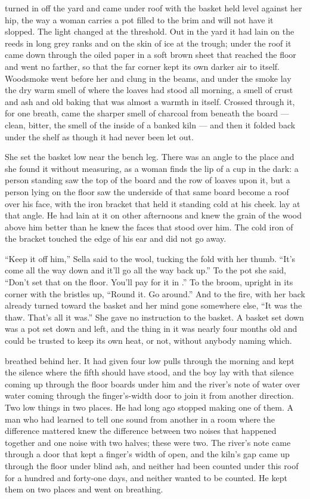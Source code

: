  turned in off the yard and came under  roof with the basket held level against her hip, the way a woman carries a pot filled to the brim and will not have it slopped. The light changed at the threshold. Out in the yard it had lain on the reeds in long grey ranks and on the skin of ice at the trough; under the roof it came down through the oiled paper in a soft brown sheet that reached the floor and went no farther, so that the far corner kept its own darker air to itself. Woodsmoke went before her and clung in the beams, and under the smoke lay the dry warm smell of  where the loaves had stood all morning, a smell of crust and ash and old baking that was almost a warmth in itself. Crossed through it, for one breath, came the sharper smell of charcoal from beneath the board --- clean, bitter, the smell of the inside of a banked kiln --- and then it folded back under the shelf as though it had never been let out.

She set the basket low near the bench leg. There was an angle to the place and she found it without measuring, as a woman finds the lip of a cup in the dark: a person standing saw the top of the board and the row of loaves upon it, but a person lying on the floor saw the underside of that same board become a roof over his face, with the iron bracket that held it standing cold at his cheek.  lay at that angle. He had lain at it on other afternoons and knew the grain of the wood above him better than he knew the faces that stood over him. The cold iron of the bracket touched the edge of his ear and did not go away.

“Keep it off him,” Sella said to the wool, tucking the fold with her thumb. “It's come all the way down and it'll go all the way back up.” To the pot she said, “Don't set that on the floor. You'll pay for it in .” To the broom, upright in its corner with the bristles up, “Round it. Go around.” And to the fire, with her back already turned toward the basket and her mind gone somewhere else, “It was the thaw. That's all it was.” She gave no instruction to the basket. A basket set down was a pot set down and left, and the thing in it was nearly four months old and could be trusted to keep its own heat, or not, without anybody naming which.

 breathed behind her. It had given four low pulls through the morning and kept the silence where the fifth should have stood, and the boy lay with that silence coming up through the floor boards under him and the river's note of water over water coming through the finger's-width door to join it from another direction. Two low things in two places. He had long ago stopped making one of them. A man who had learned to tell one sound from another in a room where the difference mattered knew the difference between two noises that happened together and one noise with two halves; these were two. The river's note came through a door that kept a finger's width of open, and the kiln's gap came up through the floor under blind ash, and neither had been counted under this roof for a hundred and forty-one days, and neither wanted to be counted. He kept them on two places and went on breathing.

